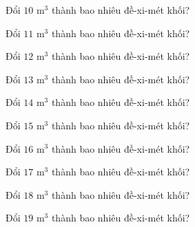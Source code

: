 \begin{ex}
  Đổi $10\text{ m}^3$ thành bao nhiêu đề-xi-mét khối?
\end{ex}

\begin{ex}
  Đổi $11\text{ m}^3$ thành bao nhiêu đề-xi-mét khối?
\end{ex}

\begin{ex}
  Đổi $12\text{ m}^3$ thành bao nhiêu đề-xi-mét khối?
\end{ex}

\begin{ex}
  Đổi $13\text{ m}^3$ thành bao nhiêu đề-xi-mét khối?
\end{ex}

\begin{ex}
  Đổi $14\text{ m}^3$ thành bao nhiêu đề-xi-mét khối?
\end{ex}

\begin{ex}
  Đổi $15\text{ m}^3$ thành bao nhiêu đề-xi-mét khối?
\end{ex}

\begin{ex}
  Đổi $16\text{ m}^3$ thành bao nhiêu đề-xi-mét khối?
\end{ex}

\begin{ex}
  Đổi $17\text{ m}^3$ thành bao nhiêu đề-xi-mét khối?
\end{ex}

\begin{ex}
  Đổi $18\text{ m}^3$ thành bao nhiêu đề-xi-mét khối?
\end{ex}

\begin{ex}
  Đổi $19\text{ m}^3$ thành bao nhiêu đề-xi-mét khối?
\end{ex}

